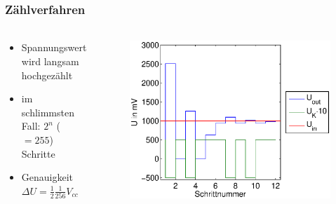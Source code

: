 \begin{frame}
    \frametitle{Zählverfahren}
    \framesubtitle{}
    \begin{columns}[c]
            \begin{block}{}
                \begin{itemize}
                    \item Spannungswert wird langsam hochgezählt
                    \item im schlimmsten Fall: $2^n$ ($=255$) Schritte
                    \item Genauigkeit $\Delta U = \frac{1}{2}\frac{1}{256} V_{cc}$
                \end{itemize}
            \end{block}
            \begin{figure}[H]
            \begin{center}
                    \includegraphics[scale=0.4]{./img/graph/Aufgabe2a2.eps}
            \end{center}
            \end{figure}
    \end{columns}
\end{frame}

